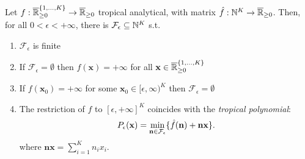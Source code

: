 \begin{theorem}
Let $f:\overline{\mathbb{R}}_{\geq 0}^{\{1,\dots, K\}} \to \overline{\mathbb{R}}_{\geq 0}$ tropical analytical, with matrix $\hat f : \mathbb{N}^{K} \to \overline{\mathbb{R}}_{\geq 0}$.
Then, for all $0<\epsilon<+\infty$, there is $\mathcal{F}_\epsilon\subseteq\mathbb{N}^{K}$ s.t.\
\begin{enumerate}
 \item $\mathcal{F}_\epsilon$ is finite
 \item If $\mathcal{F}_\epsilon= \emptyset$ then $f(\mathbf x) = +\infty$ for all $\mathbf x\in \overline{\mathbb{R}}_{\geq 0}^{\{1,\dots, K\}}$
 \item If $f(\mathbf x_0) = +\infty$ for some $\mathbf x_0\in [\epsilon,\infty)^{K}$ then $\mathcal{F}_\epsilon= \emptyset$
 \item The restriction of $f$ to $[\epsilon,+\infty]^{K}$ coincides with the  \emph{tropical polynomial}:
      \[
        P_\epsilon(\mathbf x)= \min\limits_{\mathbf n\in\mathcal{F}_\epsilon} \{\hat f (\mathbf n) + \mathbf n\mathbf x\}.
      \]
      where $\mathbf n\mathbf x= \sum_{i=1}^{K}n_{i}x_{i}$.
\end{enumerate}
\end{theorem}
